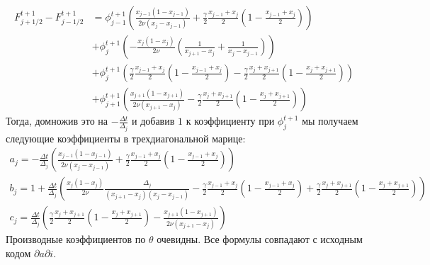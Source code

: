 \documentclass[10pt]{article}
\theoremstyle{plain}
\theoremstyle{remark}
\begin{document}
\begin{itemize}
\begin{itemize}
\begin{align*}
      F_{j + 1/2}^{t + 1} - F_{j - 1/2}^{t + 1} 
      &= \phi_{j - 1}^{t + 1} \left(\frac{x_{j - 1}(1 - x_{j - 1})}{2\nu(x_j - x_{j - 1})} 
      + \frac{\gamma}{2} \frac{x_{j - 1} + x_j}{2}\left(1 - \frac{x_{j - 1} + x_j}{2}\right)\right)
      \\
      &+ \phi_{j}^{t + 1} \left( -\frac{x_j(1 - x_j)}{2\nu}\left(\frac{1}{x_{j + 1} - x_j} + \frac{1}{x_j - x_{j - 1}} \right) \right)
      \\
      &+ \phi_{j}^{t + 1}\left(\frac{\gamma}{2}\frac{x_{j - 1} + x_j}{2}\left(1 - \frac{x_{j - 1} + x_j}{2}\right) 
                             - \frac{\gamma}{2}\frac{x_j + x_{j + 1}}{2}\left(1 - \frac{x_j + x_{j + 1}}{2}\right)\right)
      \\
      &+ \phi_{j + 1}^{t + 1} \left(\frac{x_{j + 1}(1 - x_{j +1})}{2\nu(x_{j + 1} - x_j)} 
      - \frac{\gamma}{2}\frac{x_j + x_{j + 1}}{2} \left(1 - \frac{x_j + x_{j + 1}}{2}\right) \right)
    \end{align*}
    Тогда, домножив это на $-\frac{\Delta t}{\Delta_j}$ и добавив $1$ к коэффициенту при $\phi_j^{t + 1}$ мы получаем следующие коэффициенты в
    трехдиагональной марице:
    \begin{gather*}
      \boxed{a_j} = -\frac{\Delta t}{\Delta_j}\left(\frac{x_{j - 1}(1 - x_{j - 1})}{2\nu(x_j - x_{j - 1})} 
      + \frac{\gamma}{2} \frac{x_{j - 1} + x_j}{2}\left(1 - \frac{x_{j - 1} + x_j}{2}\right)\right) \\
      \boxed{b_j} = 1 + \frac{\Delta t}{\Delta_j} \left( \frac{x_j(1 - x_j)}{2\nu}\frac{\Delta_j}{(x_{j + 1} - x_j)(x_j - x_{j - 1})} 
      -\frac{\gamma}{2}\frac{x_{j - 1} + x_j}{2}\left(1 - \frac{x_{j - 1} + x_j}{2}\right) 
                             + \frac{\gamma}{2}\frac{x_j + x_{j + 1}}{2}\left(1 - \frac{x_j + x_{j + 1}}{2}\right) \right) \\
      \boxed{c_j} = \frac{\Delta t}{\Delta_j} \left(\frac{\gamma}{2}\frac{x_j + x_{j + 1}}{2} \left(1 - \frac{x_j + x_{j + 1}}{2}\right) 
      - \frac{x_{j + 1}(1 - x_{j +1})}{2\nu(x_{j + 1} - x_j)} \right)
    \end{gather*}
    Производные коэффициентов по $\theta$ очевидны. Все формулы совпадают с исходным кодом $\partial a \partial i$.


\end{itemize}
\end{itemize}
\end{document}
